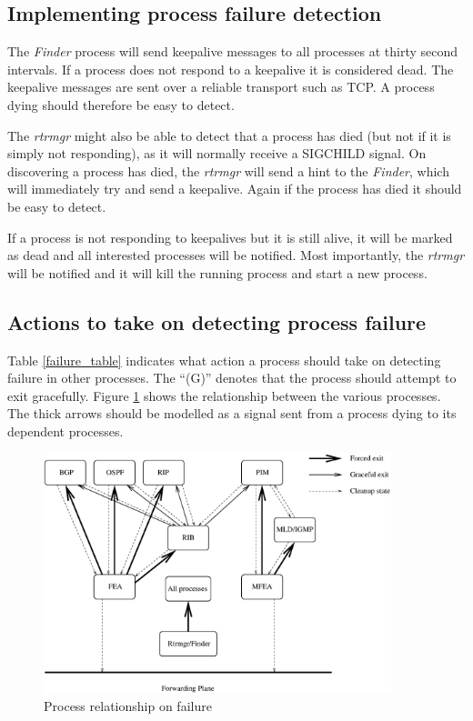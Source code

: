 \documentclass[11pt]{article}
\makeatletter
\newcommand{\finder} {{\em Finder}\@\xspace}
\newcommand{\rtrmgr} {{\em rtrmgr}\@\xspace}
\makeatother
\begin{document}
\subsection{Implementing process failure detection}

The \finder process will send keepalive messages to all processes at
thirty second intervals. If a process does not respond to a keepalive
it is considered dead. The keepalive messages are sent over a reliable
transport such as TCP. A process dying should therefore be easy to
detect. 

The \rtrmgr might also be able to detect that a process has died (but
not if it is simply not responding), as it will normally receive a
SIGCHILD signal.  On discovering a process has died, the \rtrmgr will
send a hint to the \finder, which will immediately try and send a
keepalive.  Again if the process has died it should be easy to detect.

If a process is not responding to keepalives but it is still alive, it
will be marked as dead and all interested processes will be notified.
Most importantly, the \rtrmgr will be notified and it will kill the
running process and start a new process.

\subsection{Actions to take on detecting process failure}

Table \ref{failure_table} indicates what action a process should take
on detecting failure in other processes. The ``(G)'' denotes that the
process should attempt to exit gracefully. Figure \ref{failure_fig}
shows the relationship between the various processes. The thick arrows
should be modelled as a signal sent from a process dying to its
dependent processes.

\begin{figure}
  \begin{center}
    \includegraphics[width=0.9\textwidth]{figs/error_dependency.eps}
    \caption{Process relationship on failure}
    \label{failure_fig}
  \end{center}
\end{figure}
\end{document}
